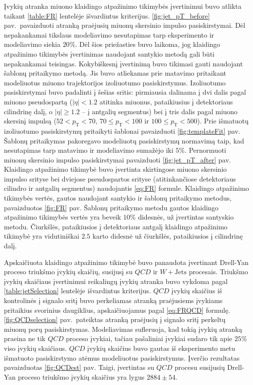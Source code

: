 \documentclass[a4paper, 12pt, oneside]{article}
\newcommand{\pT}{p_{\mathrm{T}}}
\newcommand{\WJets}{W\! +\!\mathrm{Jets}}
\newcommand{\QCD}{QC\! D}
\newlength\q
\begin{document}
Įvykių atranka miuono klaidingo atpažinimo tikimybės įvertinimui buvo atlikta taikant \ref{table:FR} lentelėje išvardintus
kriterijus.
\ref{fig:jet_pT_before} pav.\ pavaizduoti atranką praėjusių miuonų skersinio impulso pasiskirstymai.
Dėl nepakankamai tikslaus modeliavimo nesutapimas tarp eksperimento ir modeliavimo siekia $20\%$.
Dėl šios priežasties buvo laikoma, jog klaidingo atpažinimo tikimybės įvertinimas naudojant santykio metodą gali būti
nepakankamai teisingas.
Kokybiškesnį įvertinimą buvo tikimasi gauti naudojant šablonų pritaikymo metodą.
Jis buvo atliekamas prie matavimo pritaikant modeliuotus miuono trajektorijos izoliuotumo pasiskirstymus.
Izoliuotumo pasiskirstymai buvo padalinti į šešias sritis: pirmiausia dalinama į dvi dalis pagal miuono pseudospartą
($|\eta|<1.2$ atitinka miuonus, pataikiusius į detektoriaus cilindrinę dalį, o $|\eta|\geqslant 1.2$ -- į antgalių segmentus)
bei į tris dalis pagal miuono skersinį impulsą ($52<\pT<70$, $70\leqslant \pT<100$ ir $100\leqslant \pT<500$).
Prie išmatuotų izoliuotumo pasiskirstymų pritaikyti šablonai pavaizduoti \ref{fig:templateFit} pav.
Šablonų pritaikymas pakoregavo modeliuotų pasiskirstymų normavimą taip, kad nesutapimas tarp matavimo ir modeliavimo
sumažėjo iki $5\%$.
Pernormuoti miuonų skersinio impulso pasiskirstymai pavaizduoti \ref{fig:jet_pT_after} pav.
Klaidingo atpažinimo tikimybė buvo įvertinta skirtingose miuono skersinio impulso srityse bei dviejose pseudospartos srityse
(atitinkančiose detektoriaus cilindro ir antgalių segmentus) naudojantis \ref{eq:FR} formule.
Klaidingo atpažinimo tikimybės vertės, gautos naudojant santykio ir šablonų pritaikymo metodus, pavaizduotos \ref{fig:FR} pav.
Šablonų pritaikymo metodu gautos klaidingo atpažinimo tikimybės vertės yra beveik $10\%$ didesnės, už įvertintas
santyskio metodu.
Čiurkšlės, pataikiusios į detektoriaus antgalį klaidingo atpažinimo tikimybė yra vidutiniškai $2.5$ karto didesnė už
čiurkšlės, pataikiusios į cilindrinę dalį.

Apskaičiuota klaidingo atpažinimo tikimybė buvo panaudota įvertinant Drell-Yan proceso triukšmo įvykių skaičių, susijusį su
$\QCD$ ir $\WJets$ procesais.
Triukšmo įvykių skaičiaus įvertinimui reikalingų įvykių atranka buvo vykdoma pagal \ref{table:jetSelection} lentelėje
išvardintus kriterijus.
$\QCD$ įvykių skaičius iš kontrolinės į signalo sritį buvo perkeliamas atranką praėjusiems įvykiams pritaikius svorinius
daugiklius, apskaičiuojamus pagal \ref{eq:FRQCD} formulę.
\ref{fig:QCDselection} pav.\ pateiktas atranką praėjusių į signalo sritį perkeltų miuonų porų pasiskirstymas.
Modeliavimas sufleruoja, kad tokią įvykių atranką praeina ne tik $\QCD$ proceso įvykiai, tačiau pašaliniai įvykiai
sudaro tik apie $25\%$ viso įvykių skaičiaus.
$\QCD$ įvykių skaičius buvo gautas iš eksperimento metu išmatuoto pasiskirstymo atėmus modeliuotus pasiskirstymus.
Įverčio rezultatas pavaizduotas \ref{fig:QCDest} pav.
Taigi, įvertintas su $\QCD$ procesu susijusių Drell-Yan proceso triukšmo įvykių skaičius yra lygus $2884\pm 54$.
\end{document}
